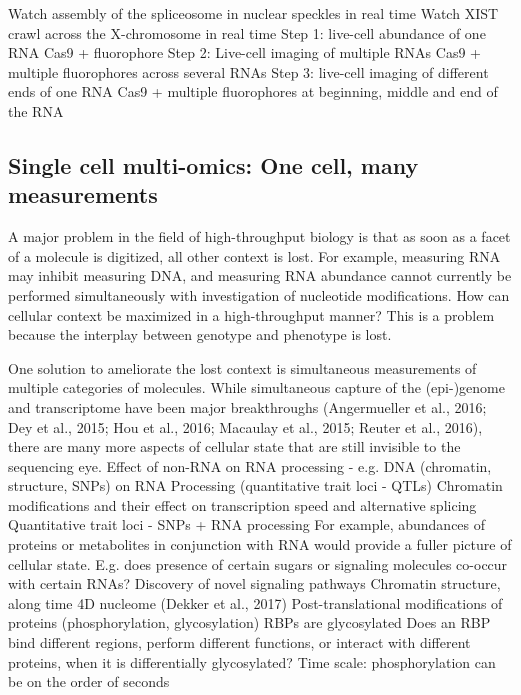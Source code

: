 Watch assembly of the spliceosome in nuclear speckles in real time
Watch XIST crawl across the X-chromosome in real time
Step 1: live-cell abundance of one RNA
Cas9 + fluorophore
Step 2: Live-cell imaging of multiple RNAs
Cas9 + multiple fluorophores across several RNAs
Step 3: live-cell imaging of different ends of one RNA
Cas9 + multiple fluorophores at beginning, middle and end of the RNA



\subsection{Single cell multi-omics: One cell, many measurements}

A major problem in the field of high-throughput biology is that as soon as a facet of a molecule is digitized, all other context is lost. For example, measuring RNA may inhibit measuring DNA, and measuring RNA abundance cannot currently be performed simultaneously with investigation of nucleotide modifications. How can cellular context be maximized in a high-throughput manner?
This is a problem because the interplay between genotype and phenotype is lost.

One solution to ameliorate the lost context is simultaneous measurements of multiple categories of molecules. While simultaneous capture of the (epi-)genome and transcriptome have been major breakthroughs (Angermueller et al., 2016; Dey et al., 2015; Hou et al., 2016; Macaulay et al., 2015; Reuter et al., 2016), there are many more aspects of cellular state that are still invisible to the sequencing eye. 
Effect of non-RNA on RNA processing - e.g. DNA (chromatin, structure, SNPs) on RNA Processing (quantitative trait loci - QTLs)
Chromatin modifications and their effect on transcription speed and alternative splicing
Quantitative trait loci - SNPs + RNA processing
For example, abundances of proteins or metabolites in conjunction with RNA would provide a fuller picture of cellular state.
E.g. does presence of certain sugars or signaling molecules co-occur with certain RNAs? Discovery of novel signaling pathways
Chromatin structure, along time 4D nucleome (Dekker et al., 2017)
Post-translational modifications of proteins (phosphorylation, glycosylation)
RBPs are glycosylated
Does an RBP bind different regions, perform different functions, or interact with different proteins, when it is differentially glycosylated?
Time scale: phosphorylation can be on the order of seconds

